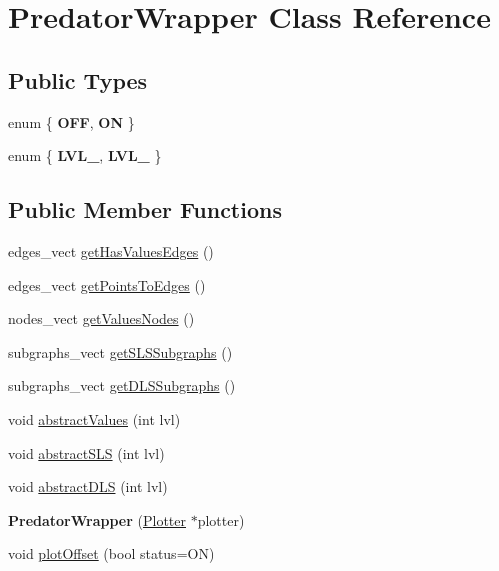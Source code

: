 \hypertarget{class_predator_wrapper}{}\section{Predator\+Wrapper Class Reference}
\label{class_predator_wrapper}
\subsection*{Public Types}
\begin{DoxyCompactItemize}
\item 
enum \{ {\bfseries O\+FF}, 
{\bfseries ON}
 \}\hypertarget{class_predator_wrapper_a61d00364cce75fc7a382d854f4257d48}{}\label{class_predator_wrapper_a61d00364cce75fc7a382d854f4257d48}

\item 
enum \{ {\bfseries L\+V\+L\+\_}, 
{\bfseries L\+V\+L\+\_}
 \}\hypertarget{class_predator_wrapper_ae5a53861863c32fa8ee1e8ee4de26890}{}\label{class_predator_wrapper_ae5a53861863c32fa8ee1e8ee4de26890}

\end{DoxyCompactItemize}
\subsection*{Public Member Functions}
\begin{DoxyCompactItemize}
\item 
edges\+\_\+vect \hyperlink{class_predator_wrapper_a4d32b122f86c58e302f45190eab5a2e7}{get\+Has\+Values\+Edges} ()
\item 
edges\+\_\+vect \hyperlink{class_predator_wrapper_af70488f448d34932749c825114de84bb}{get\+Points\+To\+Edges} ()
\item 
nodes\+\_\+vect \hyperlink{class_predator_wrapper_adbdd4a3157c1edadbe011754ab96591b}{get\+Values\+Nodes} ()
\item 
subgraphs\+\_\+vect \hyperlink{class_predator_wrapper_a2069f3a0e9181fafefd77ae6c04936d1}{get\+S\+L\+S\+Subgraphs} ()
\item 
subgraphs\+\_\+vect \hyperlink{class_predator_wrapper_a540422efe75d09ca52592a75f5695704}{get\+D\+L\+S\+Subgraphs} ()
\item 
void \hyperlink{class_predator_wrapper_aabc16bb75100e3550b57c4973e6a39ba}{abstract\+Values} (int lvl)
\item 
void \hyperlink{class_predator_wrapper_a08b997b083b4d396469485c975bc8a44}{abstract\+S\+LS} (int lvl)
\item 
void \hyperlink{class_predator_wrapper_a0c28fb703ccf3cb8241920a677eb3496}{abstract\+D\+LS} (int lvl)
\item 
{\bfseries Predator\+Wrapper} (\hyperlink{classmemgraph_1_1_plotter}{Plotter} $\ast$plotter)\hypertarget{class_predator_wrapper_a2d4a351b6629c6451c61e01f85517111}{}\label{class_predator_wrapper_a2d4a351b6629c6451c61e01f85517111}

\item 
void \hyperlink{class_predator_wrapper_af9d8739a35a2221534bc20b1f2949aba}{plot\+Offset} (bool status=ON)
\end{DoxyCompactItemize}
